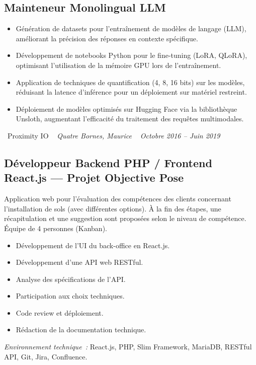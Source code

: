 \documentclass[10pt,a4paper]{article}
\begin{document}
\subsection*{Mainteneur Monolingual LLM}
\color{darkgray}
\begin{itemize}
  \item Génération de datasets pour l'entraînement de modèles de langage (LLM), améliorant la précision des réponses en contexte spécifique.
  \item Développement de notebooks Python pour le fine-tuning (LoRA, QLoRA), optimisant l'utilisation de la mémoire GPU lors de l'entraînement.
  \item Application de techniques de quantification (4, 8, 16 bits) sur les modèles, réduisant la latence d'inférence pour un déploiement sur matériel restreint.
  \item Déploiement de modèles optimisés sur Hugging Face via la bibliothèque Unsloth, augmentant l'efficacité du traitement des requêtes multimodales.
\end{itemize}

\vspace{10pt}

\noindent\textcolor{primary}{ \faBuilding\ Proximity IO} \quad
\textit{ \small \textcolor{darkgray}{ \faMapMarker\ } Quatre Bornes, Maurice } \hfill
\textit{ \small \textcolor{darkgray}{ \faCalendar\ } Octobre 2016 -- Juin 2019 }

\vspace{4pt}

\subsection*{Développeur Backend PHP / Frontend React.js --- Projet Objective Pose}
\color{darkgray}
Application web pour l'évaluation des compétences des clients concernant l'installation de sols (avec différentes options). À la fin des étapes, une récapitulation et une suggestion sont proposées selon le niveau de compétence. Équipe de 4 personnes (Kanban).
\begin{itemize}
  \item Développement de l'UI du back-office en React.js.
  \item Développement d'une API web RESTful.
  \item Analyse des spécifications de l'API.
  \item Participation aux choix techniques.
  \item Code review et déploiement.
  \item Rédaction de la documentation technique.
\end{itemize}
\textit{Environnement technique~:} React.js, PHP, Slim Framework, MariaDB, RESTful API, Git, Jira, Confluence.
\end{document}
